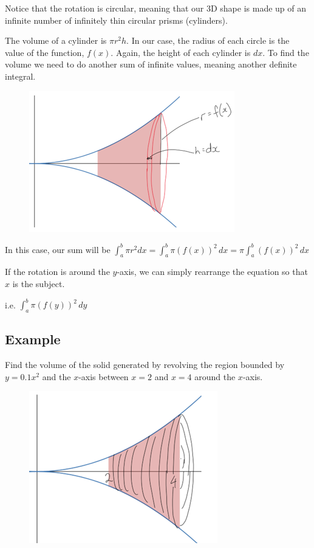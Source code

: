 \documentclass[../main.tex]{subfiles}
\begin{document}
Notice that the rotation is circular, meaning that our 3D shape is made up of an infinite number of infinitely thin circular prisms (cylinders).
    
The volume of a cylinder is $\pi r^2h$. In our case, the radius of each circle is the value of the function, $f(x)$. Again, the height of each cylinder is $dx$. To find the volume we need to do another sum of infinite values, meaning another definite integral.

\begin{figure}[h]
    \centering
    \includegraphics[width=0.5\linewidth]{images/volrev3.png}
\end{figure}

In this case, our sum will be $\int_a^b \pi r^2 dx = \int_a^b \pi (f(x))^2\,dx = \pi \int_a^b (f(x))^2\,dx$

If the rotation is around the $y$-axis, we can simply rearrange the equation so that $x$ is the subject.

i.e. $\int_a^b \pi (f(y))^2\,dy$

\subsection*{Example}
Find the volume of the solid generated by revolving the region bounded by $y=0.1x^2$ and the $x$-axis between $x=2$ and $x=4$ around the $x$-axis.

\begin{figure}[h]
    \centering
    \includegraphics[width=0.5\linewidth]{images/volrev4.png}
\end{figure}
\end{document}
